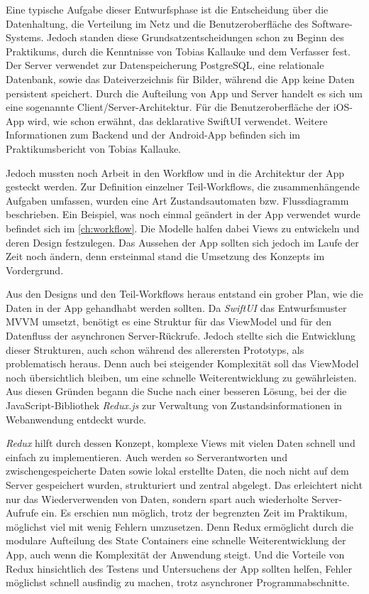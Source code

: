 \documentclass[notables, nomenclature, oneside, 150]{HSMW-Thesis}
\begin{document}
		Eine typische Aufgabe dieser Entwurfsphase ist die Entscheidung über die Datenhaltung, die Verteilung im Netz und die Benutzeroberfläche des Software-Systems. Jedoch standen diese Grundsatzentscheidungen schon zu Beginn des Praktikums, durch die Kenntnisse von Tobias Kallauke und dem Verfasser fest. Der Server verwendet zur Datenspeicherung PostgreSQL, eine relationale Datenbank, sowie das Dateiverzeichnis für Bilder, während die App keine Daten persistent speichert. Durch die Aufteilung von App und Server handelt es sich um eine sogenannte Client/Server-Architektur. Für die Benutzeroberfläche der iOS-App wird, wie schon erwähnt, das deklarative SwiftUI verwendet. Weitere Informationen zum Backend und der Android-App befinden sich im Praktikumsbericht von Tobias Kallauke.
		
		Jedoch mussten noch Arbeit in den Workflow und in die Architektur der App gesteckt werden. Zur Definition einzelner Teil-Workflows, die zusammenhängende Aufgaben umfassen, wurden eine Art Zustandsautomaten bzw. Flussdiagramm beschrieben. Ein Beispiel, was noch einmal geändert in der App verwendet wurde befindet sich im \autoref{ch:workflow}. Die Modelle halfen dabei Views zu entwickeln und deren Design festzulegen. Das Aussehen der App sollten sich jedoch im Laufe der Zeit noch ändern, denn ersteinmal stand die Umsetzung des Konzepts im Vordergrund.

		Aus den Designs und den Teil-Workflows heraus entstand ein grober Plan, wie die Daten in der App gehandhabt werden sollten. Da \textit{SwiftUI} das Entwurfsmuster MVVM umsetzt, benötigt es eine Struktur für das ViewModel und für den Datenfluss der asynchronen Server-Rückrufe. Jedoch stellte sich die Entwicklung dieser Strukturen, auch schon während des allerersten Prototyps, als problematisch heraus. Denn auch bei steigender Komplexität soll das ViewModel noch übersichtlich bleiben, um eine schnelle Weiterentwicklung zu gewährleisten. Aus diesen Gründen begann die Suche nach einer besseren Lösung, bei der die JavaScript-Bibliothek \textit{Redux.js} zur Verwaltung von Zustandsinformationen in Webanwendung entdeckt wurde. 

		\textit{Redux} hilft durch dessen Konzept, komplexe Views mit vielen Daten schnell und einfach zu implementieren. Auch werden so Serverantworten und zwischengespeicherte Daten sowie lokal erstellte Daten, die noch nicht auf dem Server gespeichert wurden, strukturiert und zentral abgelegt. Das erleichtert nicht nur das Wiederverwenden von Daten, sondern spart auch wiederholte Server-Aufrufe ein. Es erschien nun möglich, trotz der begrenzten Zeit im Praktikum, möglichst viel mit wenig Fehlern umzusetzen. Denn Redux ermöglicht durch die modulare Aufteilung des State Containers eine schnelle Weiterentwicklung der App, auch wenn die Komplexität der Anwendung steigt. Und die Vorteile von Redux hinsichtlich des Testens und Untersuchens der App sollten helfen, Fehler möglichst schnell ausfindig zu machen, trotz asynchroner Programmabschnitte.
\end{document}
